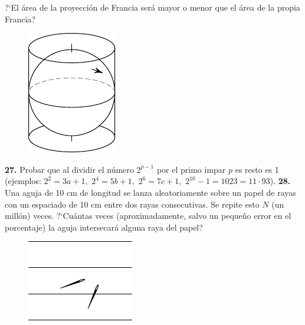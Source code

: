 \documentclass[12pt]{article}  %
\begin{document}
?`El \'area de la proyecci\'on de Francia ser\'a mayor o menor que el \'area de la propia Francia?
\begin{figure}[h]
\centering
\footnotesize
\includegraphics[scale=1]{taskbook-10}
\end{figure}

\noindent
{\bf 27.} Probar que al dividir el n\'umero $2^{p-1}$ por el primo impar $p$ es resto es 1
(ejemplos: $2^2 = 3a +1,$ $2^4 = 5b+1,$ $2^6 = 7c+1,$ 
$2^{10} - 1 = 1023 = 11\cdot 93$).  
\newline\newline\quad
{\bf 28.} Una aguja de 10 cm de longitud se lanza aleatoriamente sobre un papel de rayas con un espaciado de 10 cm entre dos rayas consecutivas. 
Se repite esto $N$ (un mill\'on) veces. 
?`Cu\'antas veces (aproximadamente, salvo un peque\~no error en el porcentaje) la aguja intersecar\'a alguna raya del papel?
\begin{figure}[h]
\centering
\footnotesize
\includegraphics[scale=1]{taskbook-12}
\end{figure}
\end{document}
